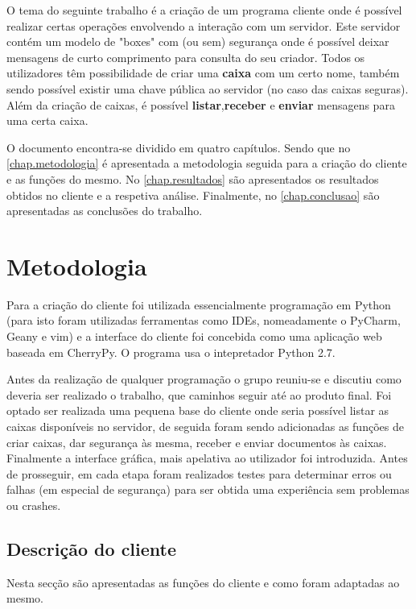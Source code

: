 \documentclass{report}
\begin{document}
O tema do seguinte trabalho é a criação de um programa cliente onde é possível realizar certas operações envolvendo a interação com um servidor.
Este servidor contém um modelo de "boxes" com (ou sem) segurança onde é possível deixar mensagens de curto comprimento para consulta do seu criador. Todos os utilizadores têm possibilidade de criar uma \textbf{caixa} com um certo nome, também sendo possível existir uma chave pública ao servidor (no caso das caixas seguras). Além da criação de caixas, é possível \textbf{listar},\textbf{receber} e \textbf{enviar} mensagens para uma certa caixa.

O documento encontra-se dividido em quatro capítulos.
Sendo que no \autoref{chap.metodologia} é apresentada a metodologia seguida para a criação do cliente e
as funções do mesmo.
No \autoref{chap.resultados} são apresentados os resultados obtidos no cliente e a respetiva análise.
Finalmente, no \autoref{chap.conclusao} são apresentadas
as conclusões do trabalho.

\chapter{Metodologia}
\label{chap.metodologia}

Para a criação do cliente foi utilizada essencialmente programação em Python (para isto foram utilizadas ferramentas como IDEs, nomeadamente o PyCharm, Geany e vim) e a interface do cliente foi concebida como uma aplicação web baseada em CherryPy. O programa usa o intepretador Python 2.7.

Antes da realização de qualquer programação o grupo reuniu-se e discutiu como deveria ser realizado o trabalho, que caminhos seguir até ao produto final. Foi optado ser realizada uma pequena base do cliente onde seria possível listar as caixas disponíveis no servidor, de seguida foram sendo adicionadas as funções de criar caixas, dar segurança às mesma, receber e enviar documentos às caixas. Finalmente a interface gráfica, mais apelativa ao utilizador foi introduzida. Antes de prosseguir, em cada etapa foram realizados testes para determinar erros ou falhas (em especial de segurança) para ser obtida uma experiência sem problemas ou crashes. 

\section{Descrição do cliente}
\label{subs.desc}
Nesta secção são apresentadas as funções do cliente e como foram adaptadas ao mesmo.
\end{document}
